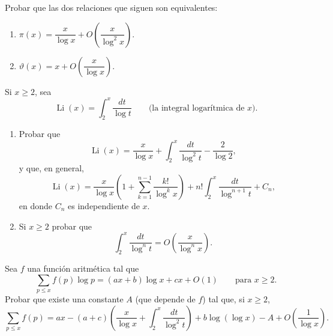 \documentclass[12pt,a4paper]{book}
\begin{document}
    \begin{ejercicio}
        Probar que las dos relaciones que siguen son equivalentes:
        \begin{enumerate}
            \item[(a)] $\pi(x)=\dfrac{x}{\log x}+O\left(\dfrac{x}{\log^2x}\right)$.
            \item[(b)] $\vartheta(x)=x+O\left(\dfrac{x}{\log x}\right)$.
        \end{enumerate}
    \end{ejercicio}

    \begin{ejercicio}
        Si $x\geq2$, sea
        \begin{equation*}
            \operatorname{Li}(x)=\int_2^x\frac{dt}{\log t}\qquad\text{(la integral logarítmica de } x\text{).}
        \end{equation*}
        \begin{enumerate}
            \item[(a)] Probar que
            \begin{equation*}
                \operatorname{Li}(x)=\frac{x}{\log x}+\int_2^x\frac{dt}{\log^2t}-\frac{2}{\log2},
            \end{equation*}
            y que, en general,
            \begin{equation*}
                \operatorname{Li}(x)=\frac{x}{\log x}\left(1+\sum_{k=1}^{n-1}\frac{k!}{\log^kx}\right)
                +n!\int_2^x\frac{dt}{\log^{n+1}t}+C_n,
            \end{equation*}
            en donde $C_n$ es independiente de $x$.
            \item[(b)] Si $x\geq2$ probar que
            \begin{equation*}
                \int_2^x\frac{dt}{\log^nt}=O\left(\frac{x}{\log^nx}\right).
            \end{equation*}
        \end{enumerate}
    \end{ejercicio}

    \begin{ejercicio}
        Sea $f$ una función aritmética tal que
        \begin{equation*}
            \sum_{p\leq x}f(p)\log p=(ax+b)\log x+cx+O(1)\qquad\text{para } x\geq2.
        \end{equation*}
        Probar que existe una constante $A$ (que depende de $f$) tal que, si $x\geq2$,
        \begin{equation*}
            \sum_{p\leq x}f(p)=ax-(a+c)\left(\frac{x}{\log x}+\int_2^x\frac{dt}{\log^2t}\right)
            +b\log(\log x)-A+O\left(\frac{1}{\log x}\right).
        \end{equation*}
    \end{ejercicio}
\end{document}
